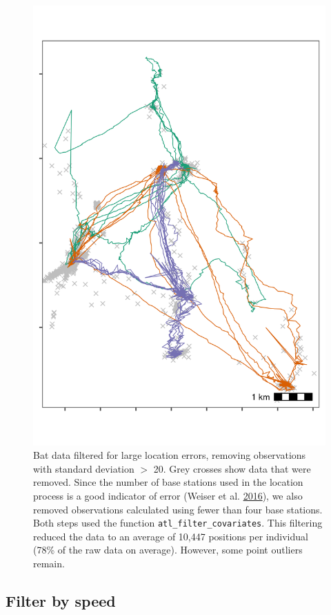 \documentclass[
]{scrartcl}
\begin{document}
\begin{figure}
\centering
\includegraphics{figures/fig_bat_filter_cov.png}
\caption{Bat data filtered for large location errors, removing observations with standard deviation \(>\) 20. Grey crosses show data that were removed. Since the number of base stations used in the location process is a good indicator of error (Weiser et al. \protect\hyperlink{ref-weiser2016}{2016}), we also removed observations calculated using fewer than four base stations. Both steps used the function \texttt{atl\_filter\_covariates}.
This filtering reduced the data to an average of 10,447 positions per individual (78\% of the raw data on average). However, some point outliers remain.}
\end{figure}

\hypertarget{filter-by-speed}{%
\subsection{Filter by speed}\label{filter-by-speed}}
\end{document}
